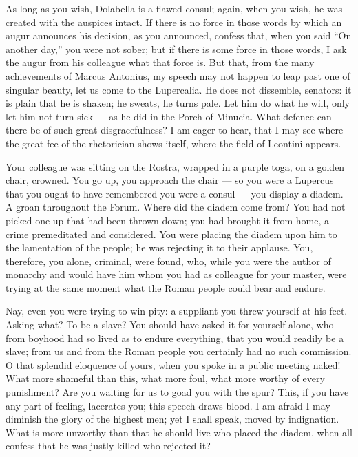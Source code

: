  As long as you wish, Dolabella is a flawed consul; again, when you wish, he was created with the auspices intact. If there is no force in those words by which an augur announces his decision, as you announced, confess that, when you said ``On another day,'' you were not sober; but if there is some force in those words, I ask the augur from his colleague what that force is. But that, from the many achievements of Marcus Antonius, my speech may not happen to leap past one of singular beauty, let us come to the Lupercalia. He does not dissemble, senators: it is plain that he is shaken; he sweats, he turns pale. Let him do what he will, only let him not turn sick --- as he did in the Porch of Minucia. What defence can there be of such great disgracefulness? I am eager to hear, that I may see where the great fee of the rhetorician shows itself, where the field of Leontini appears.

 Your colleague was sitting on the Rostra, wrapped in a purple toga, on a golden chair, crowned. You go up, you approach the chair --- so you were a Lupercus that you ought to have remembered you were a consul --- you display a diadem. A groan throughout the Forum. Where did the diadem come from? You had not picked one up that had been thrown down; you had brought it from home, a crime premeditated and considered. You were placing the diadem upon him to the lamentation of the people; he was rejecting it to their applause. You, therefore, you alone, criminal, were found, who, while you were the author of monarchy and would have him whom you had as colleague for your master, were trying at the same moment what the Roman people could bear and endure.

 Nay, even you were trying to win pity: a suppliant you threw yourself at his feet. Asking what? To be a slave? You should have asked it for yourself alone, who from boyhood had so lived as to endure everything, that you would readily be a slave; from us and from the Roman people you certainly had no such commission. O that splendid eloquence of yours, when you spoke in a public meeting naked! What more shameful than this, what more foul, what more worthy of every punishment? Are you waiting for us to goad you with the spur? This, if you have any part of feeling, lacerates you; this speech draws blood. I am afraid I may diminish the glory of the highest men; yet I shall speak, moved by indignation. What is more unworthy than that he should live who placed the diadem, when all confess that he was justly killed who rejected it?

